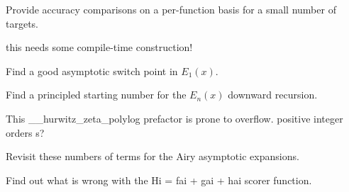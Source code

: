 
\begin{DoxyRefList}
\item[\label{todo__todo000001}%
\hypertarget{todo__todo000001}{}%
page \hyperlink{index}{Mathematical Special Functions} ]Provide accuracy comparisons on a per-\/function basis for a small number of targets. 
\item[\label{todo__todo000004}%
\hypertarget{todo__todo000004}{}%
Member \hyperlink{namespacestd_1_1____detail_a3ad3b7b4dcebdf69778dbf7a5ba2427c}{std\+:\+:\+\_\+\+\_\+detail\+:\+:\+\_\+\+\_\+dawson\+\_\+cont\+\_\+frac} (\+\_\+\+Tp \+\_\+\+\_\+x)]this needs some compile-\/time construction!  
\item[\label{todo__todo000006}%
\hypertarget{todo__todo000006}{}%
Member \hyperlink{namespacestd_1_1____detail_a665eb0c524b929c035d88bbb17815917}{std\+:\+:\+\_\+\+\_\+detail\+:\+:\+\_\+\+\_\+expint\+\_\+\+E1} (\+\_\+\+Tp \+\_\+\+\_\+x)]Find a good asymptotic switch point in $ E_1(x) $.  
\item[\label{todo__todo000005}%
\hypertarget{todo__todo000005}{}%
Member \hyperlink{namespacestd_1_1____detail_a9b0a2050324390fb6c4a584170289a99}{std\+:\+:\+\_\+\+\_\+detail\+:\+:\+\_\+\+\_\+expint\+\_\+\+En\+\_\+recursion} (unsigned int \+\_\+\+\_\+n, \+\_\+\+Tp \+\_\+\+\_\+x)]Find a principled starting number for the $ E_n(x) $ downward recursion.  
\item[\label{todo__todo000007}%
\hypertarget{todo__todo000007}{}%
Member \hyperlink{namespacestd_1_1____detail_a7c45415c3ec0e137eea2364a6dd3af4e}{std\+:\+:\+\_\+\+\_\+detail\+:\+:\+\_\+\+\_\+hurwitz\+\_\+zeta\+\_\+polylog} (\+\_\+\+Tp \+\_\+\+\_\+s, std\+::complex$<$ \+\_\+\+Tp $>$ \+\_\+\+\_\+a)]This \+\_\+\+\_\+hurwitz\+\_\+zeta\+\_\+polylog prefactor is prone to overflow. positive integer orders s?  
\item[\label{todo__todo000003}%
\hypertarget{todo__todo000003}{}%
Member \hyperlink{classstd_1_1____detail_1_1__Airy__asymp_a6ae932883f0b6cfe86c6e7beda807385}{std\+:\+:\+\_\+\+\_\+detail\+:\+:\+\_\+\+Airy\+\_\+asymp$<$ \+\_\+\+Tp $>$\+:\+:\+\_\+\+S\+\_\+absarg\+\_\+lt\+\_\+pio3} (std\+::complex$<$ \+\_\+\+Tp $>$ \+\_\+\+\_\+z) const ]Revisit these numbers of terms for the Airy asymptotic expansions.  
\item[\label{todo__todo000002}%
\hypertarget{todo__todo000002}{}%
Member \hyperlink{classstd_1_1____detail_1_1__Airy__series_a7d6250d9854644966a349669ddf2d929}{std\+:\+:\+\_\+\+\_\+detail\+:\+:\+\_\+\+Airy\+\_\+series$<$ \+\_\+\+Tp $>$\+:\+:\+\_\+\+S\+\_\+\+Scorer} (std\+::complex$<$ \+\_\+\+Tp $>$ \+\_\+\+\_\+t)]Find out what is wrong with the Hi = fai + gai + hai scorer function.
\end{DoxyRefList}